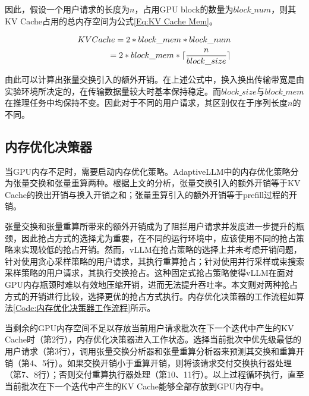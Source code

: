 因此，假设一个用户请求的长度为$n$，占用GPU block的数量为$block\_num$，则其KV Cache占用的总内存空间为公式\ref{Eq:KV Cache Mem}。

\begin{equation}
  \begin{aligned}
    KVCache = 2 * block\_mem * block\_num  \\ =  2 * block\_mem * \lceil \frac{n}{block\_size} \rceil
  \end{aligned}
  \label{Eq:KV Cache Mem}
  \setlength{\abovedisplayskip}{0ex}
  \setlength{\belowdisplayskip}{2ex}
\end{equation}

由此可以计算出张量交换引入的额外开销。在上述公式中，换入换出传输带宽是由实验环境所决定的，在传输数据量较大时基本保持稳定。而$block\_size$与$block\_mem$在推理任务中均保持不变。因此对于不同的用户请求，其区别仅在于序列长度$n$的不同。

\subsection{内存优化决策器}

当GPU内存不足时，需要启动内存优化策略。AdaptiveLLM中的内存优化策略分为张量交换和张量重算两种。根据上文的分析，张量交换引入的额外开销等于KV Cache的换出开销与换入开销之和；张量重算引入的额外开销等于prefill过程的开销。\par

张量交换和张量重算所带来的额外开销成为了阻拦用户请求并发度进一步提升的瓶颈，因此抢占方式的选择尤为重要，在不同的运行环境中，应该使用不同的抢占策略来实现较低的抢占开销。然而，vLLM在抢占策略的选择上并未考虑开销问题，针对使用贪心采样策略的用户请求，其执行重算抢占；针对使用并行采样或束搜索采样策略的用户请求，其执行交换抢占。这种固定式抢占策略使得vLLM在面对GPU内存瓶颈时难以有效地压缩开销，进而无法提升吞吐率。本文则对两种抢占方式的开销进行比较，选择更优的抢占方式执行。内存优化决策器的工作流程如算法\ref{Code:内存优化决策器工作流程}所示。\par

当剩余的GPU内存空间不足以存放当前用户请求批次在下一个迭代中产生的KV Cache时（第2行），内存优化决策器进入工作状态。选择当前批次中优先级最低的用户请求（第3行），调用张量交换分析器和张量重算分析器来预测其交换和重算开销（第4、5行）。如果交换开销小于重算开销，则将该请求交付交换执行器处理（第7、8行）；否则交付重算执行器处理（第10、11行）。以上过程循环执行，直至当前批次在下一个迭代中产生的KV Cache能够全部存放到GPU内存中。 

